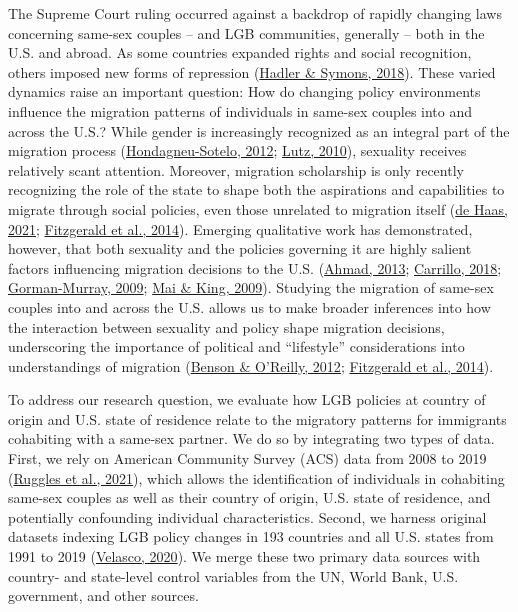 \documentclass[
  11pt,
]{article}
\begin{document}
The Supreme Court ruling occurred against a backdrop of rapidly changing laws concerning same-sex couples -- and LGB communities, generally -- both in the U.S. and abroad. As some countries expanded rights and social recognition, others imposed new forms of repression (\protect\hyperlink{ref-hadler_2018_world}{Hadler \& Symons, 2018}). These varied dynamics raise an important question: How do changing policy environments influence the migration patterns of individuals in same-sex couples into and across the U.S.? While gender is increasingly recognized as an integral part of the migration process (\protect\hyperlink{ref-hondagneu-sotelo_2012}{Hondagneu-Sotelo, 2012}; \protect\hyperlink{ref-lutz_2010}{Lutz, 2010}), sexuality receives relatively scant attention. Moreover, migration scholarship is only recently recognizing the role of the state to shape both the aspirations and capabilities to migrate through social policies, even those unrelated to migration itself (\protect\hyperlink{ref-dehaas_2021}{de Haas, 2021}; \protect\hyperlink{ref-fitzgerald_2014}{Fitzgerald et al., 2014}). Emerging qualitative work has demonstrated, however, that both sexuality and the policies governing it are highly salient factors influencing migration decisions to the U.S. (\protect\hyperlink{ref-ahmad_2013}{Ahmad, 2013}; \protect\hyperlink{ref-carrillo_2018}{Carrillo, 2018}; \protect\hyperlink{ref-gorman-murray_2009}{Gorman-Murray, 2009}; \protect\hyperlink{ref-mai_2009}{Mai \& King, 2009}). Studying the migration of same-sex couples into and across the U.S. allows us to make broader inferences into how the interaction between sexuality and policy shape migration decisions, underscoring the importance of political and ``lifestyle'' considerations into understandings of migration (\protect\hyperlink{ref-benson_2012}{Benson \& O'Reilly, 2012}; \protect\hyperlink{ref-fitzgerald_2014}{Fitzgerald et al., 2014}).

To address our research question, we evaluate how LGB policies at country of origin and U.S. state of residence relate to the migratory patterns for immigrants cohabiting with a same-sex partner. We do so by integrating two types of data. First, we rely on American Community Survey (ACS) data from 2008 to 2019 (\protect\hyperlink{ref-ruggles_2021}{Ruggles et al., 2021}), which allows the identification of individuals in cohabiting same-sex couples as well as their country of origin, U.S. state of residence, and potentially confounding individual characteristics. Second, we harness original datasets indexing LGB policy changes in 193 countries and all U.S. states from 1991 to 2019 (\protect\hyperlink{ref-velasco_2020}{Velasco, 2020}). We merge these two primary data sources with country- and state-level control variables from the UN, World Bank, U.S. government, and other sources.
\end{document}
